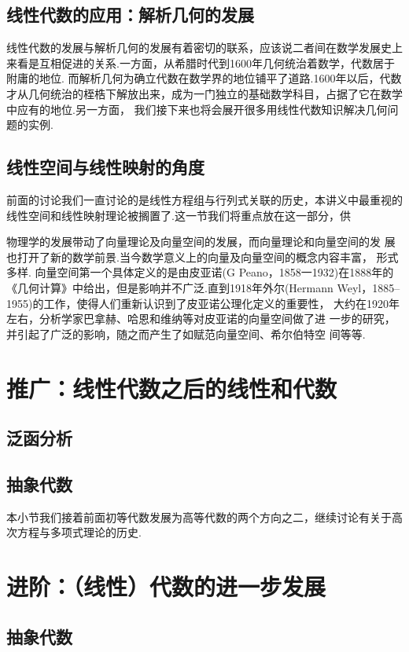 \subsection{线性代数的应用：解析几何的发展}
线性代数的发展与解析几何的发展有着密切的联系，应该说二者间在数学发展史上来看是互相促进的关系.一方面，从希腊时代到1600年几何统治着数学，代数居于附庸的地位.
而解析几何为确立代数在数学界的地位铺平了道路.1600年以后，代数才从几何统治的桎梏下解放出来，成为一门独立的基础数学科目，占据了它在数学中应有的地位.另一方面，
我们接下来也将会展开很多用线性代数知识解决几何问题的实例.

\subsection{线性空间与线性映射的角度}
前面的讨论我们一直讨论的是线性方程组与行列式关联的历史，本讲义中最重视的线性空间和线性映射理论被搁置了.这一节我们将重点放在这一部分，供

物理学的发展带动了向量理论及向量空间的发展，而向量理论和向量空间的发
展也打开了新的数学前景.当今数学意义上的向量及向量空间的概念内容丰富，
形式多样.
向量空间第一个具体定义的是由皮亚诺(G Peano，1858一1932)在1888年的
《几何计算》中给出，但是影响并不广泛.直到1918年外尔(Hermann
Weyl，1885--1955)的工作，使得人们重新认识到了皮亚诺公理化定义的重要性，
大约在1920年左右，分析学家巴拿赫、哈恩和维纳等对皮亚诺的向量空间做了进
一步的研究，并引起了广泛的影响，随之而产生了如赋范向量空间、希尔伯特空
间等等.

\section{推广：线性代数之后的线性和代数}
\subsection{泛函分析}


\subsection{抽象代数}
本小节我们接着前面初等代数发展为高等代数的两个方向之二，继续讨论有关于高次方程与多项式理论的历史.

\section{进阶：（线性）代数的进一步发展}
\subsection{抽象代数}



